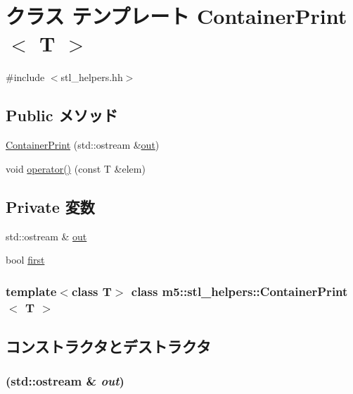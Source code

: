 \hypertarget{classm5_1_1stl__helpers_1_1ContainerPrint}{
\section{クラス テンプレート ContainerPrint$<$ T $>$}
\label{classm5_1_1stl__helpers_1_1ContainerPrint}
}


{\ttfamily \#include $<$stl\_\-helpers.hh$>$}\subsection*{Public メソッド}
\begin{DoxyCompactItemize}
\item 
\hyperlink{classm5_1_1stl__helpers_1_1ContainerPrint_ac160bc000adcefd9f1d8d4e8caa6fb5d}{ContainerPrint} (std::ostream \&\hyperlink{classm5_1_1stl__helpers_1_1ContainerPrint_ad61aa84163ca07736ad2f6cf1eeb19cf}{out})
\item 
void \hyperlink{classm5_1_1stl__helpers_1_1ContainerPrint_a22291398c467d0b6b717e6a5d98421cb}{operator()} (const T \&elem)
\end{DoxyCompactItemize}
\subsection*{Private 変数}
\begin{DoxyCompactItemize}
\item 
std::ostream \& \hyperlink{classm5_1_1stl__helpers_1_1ContainerPrint_ad61aa84163ca07736ad2f6cf1eeb19cf}{out}
\item 
bool \hyperlink{classm5_1_1stl__helpers_1_1ContainerPrint_a77e49fc0956d412a05337460c7778c6d}{first}
\end{DoxyCompactItemize}
\subsubsection*{template$<$class T$>$ class m5::stl\_\-helpers::ContainerPrint$<$ T $>$}



\subsection{コンストラクタとデストラクタ}
\hypertarget{classm5_1_1stl__helpers_1_1ContainerPrint_ac160bc000adcefd9f1d8d4e8caa6fb5d}{
\subsubsection[{ContainerPrint}]{ (std::ostream \& {\em out})}}
\label{classm5_1_1stl__helpers_1_1ContainerPrint_ac160bc000adcefd9f1d8d4e8caa6fb5d}



